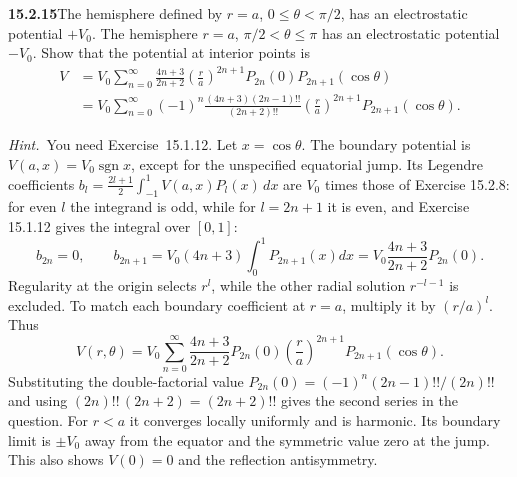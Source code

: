 \par\bigskip
\noindent\textbf{15.2.15}\quad The hemisphere defined by $r=a$,
$0\le\theta<\pi/2$, has an electrostatic potential $+V_{0}$. The
hemisphere $r=a$, $\pi/2<\theta\le\pi$ has an electrostatic potential
$-V_{0}$. Show that the potential at interior points is
\begin{align*}
V&=V_{0}\sum_{n=0}^{\infty}\frac{4n+3}{2n+2}
\left(\frac{r}{a}\right)^{2n+1}P_{2n}(0)P_{2n+1}(\cos\theta)\\
&=V_{0}\sum_{n=0}^{\infty}(-1)^{n}
\frac{(4n+3)(2n-1)!!}{(2n+2)!!}
\left(\frac{r}{a}\right)^{2n+1}P_{2n+1}(\cos\theta).
\end{align*}
\par\emph{Hint.}~You need Exercise~15.1.12.
\solution
Let $x=\cos\theta$. The boundary potential is
$V(a,x)=V_0\operatorname{sgn}x$, except for the unspecified equatorial
jump. Its Legendre coefficients
$b_l=\frac{2l+1}2\int_{-1}^1V(a,x)P_l(x)\,dx$ are $V_0$ times those of
Exercise 15.2.8: for even $l$ the integrand is odd, while for
$l=2n+1$ it is even, and Exercise 15.1.12 gives the integral over
$[0,1]$:
\[
b_{2n}=0,\qquad
b_{2n+1}=V_0(4n+3)\int_0^1P_{2n+1}(x)dx
=V_0\frac{4n+3}{2n+2}P_{2n}(0).
\]
Regularity at the origin selects $r^l$, while the other radial solution
$r^{-l-1}$ is excluded. To match each boundary coefficient at $r=a$,
multiply it by $(r/a)^l$. Thus
\[
\boxed{V(r,\theta)=V_0\sum_{n=0}^\infty
\frac{4n+3}{2n+2}P_{2n}(0)
\left(\frac ra\right)^{2n+1}P_{2n+1}(\cos\theta)}.
\]
Substituting the double-factorial value
$P_{2n}(0)=(-1)^n(2n-1)!!/(2n)!!$ and using $(2n)!!\,(2n+2)=(2n+2)!!$
gives the second series in the question. For $r<a$ it converges locally
uniformly and is harmonic. Its boundary limit is $\pm V_0$ away
from the equator and the symmetric value zero at the jump.
This also shows $V(0)=0$ and the reflection antisymmetry.


